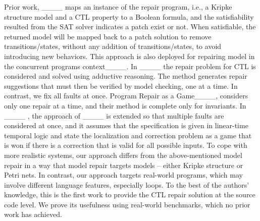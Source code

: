 Prior work, ____ maps an instance of the repair program, i.e., a Kripke structure model and a CTL property to a Boolean formula, and the satisfiability resulted from the SAT solver indicates a patch exist or not. When satisfiable, the returned model will be mapped back to a patch solution to remove transitions/states, 
without any addition of transitions/states, to avoid introducing new behaviors. 
This approach is also deployed for repairing model in the concurrent programs context____.  
In ____ the repair problem for CTL is considered and solved using adductive reasoning. The method generates repair suggestions that must then be
verified by model checking, one at a time. In contrast, we fix all faults at
once. 
Program Repair as a Game____, 
considers only one repair at a time, and their method is complete only for invariants. 
In 
____ , the approach of ____ is extended so that multiple faults are considered at once, and 
it assumes that the specification is given in linear-time
temporal logic and state the localization and correction problem as a game that
is won if there is a correction that is valid for all possible inputs. 
To cope with more realistic systems, 
our approach differs from the above-mentioned model repair in a way that model repair targets models -- either Kripke structure or Petri nets. In contrast, our approach targets 
real-world programs, which may involve different language features, especially loops. 
To the best of the authors' knowledge, this is the first work to provide the CTL repair solution at the source code level. We prove its usefulness using real-world benchmarks, which no prior work has achieved. 

\vspace{-1mm}